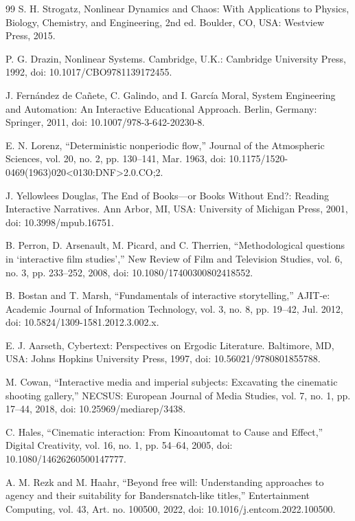 \begin{thebibliography}{99}
S. H. Strogatz, Nonlinear Dynamics and Chaos: With Applications to Physics, Biology, Chemistry, and Engineering, 2nd ed. Boulder, CO, USA: Westview Press, 2015.

P. G. Drazin, Nonlinear Systems. Cambridge, U.K.: Cambridge University Press, 1992, doi: 10.1017/CBO9781139172455.

J. Fernández de Cañete, C. Galindo, and I. García Moral, System Engineering and Automation: An Interactive Educational Approach. Berlin, Germany: Springer, 2011, doi: 10.1007/978-3-642-20230-8.

E. N. Lorenz, “Deterministic nonperiodic flow,” Journal of the Atmospheric Sciences, vol. 20, no. 2, pp. 130–141, Mar. 1963, doi: 10.1175/1520-0469(1963)020<0130:DNF>2.0.CO;2.

J. Yellowlees Douglas, The End of Books—or Books Without End?: Reading Interactive Narratives. Ann Arbor, MI, USA: University of Michigan Press, 2001, doi: 10.3998/mpub.16751.

B. Perron, D. Arsenault, M. Picard, and C. Therrien, “Methodological questions in ‘interactive film studies’,” New Review of Film and Television Studies, vol. 6, no. 3, pp. 233–252, 2008, doi: 10.1080/17400300802418552.

B. Bostan and T. Marsh, “Fundamentals of interactive storytelling,” AJIT-e: Academic Journal of Information Technology, vol. 3, no. 8, pp. 19–42, Jul. 2012, doi: 10.5824/1309-1581.2012.3.002.x.

E. J. Aarseth, Cybertext: Perspectives on Ergodic Literature. Baltimore, MD, USA: Johns Hopkins University Press, 1997, doi: 10.56021/9780801855788.

M. Cowan, “Interactive media and imperial subjects: Excavating the cinematic shooting gallery,” NECSUS: European Journal of Media Studies, vol. 7, no. 1, pp. 17–44, 2018, doi: 10.25969/mediarep/3438.

C. Hales, “Cinematic interaction: From Kinoautomat to Cause and Effect,” Digital Creativity, vol. 16, no. 1, pp. 54–64, 2005, doi: 10.1080/14626260500147777.

A. M. Rezk and M. Haahr, “Beyond free will: Understanding approaches to agency and their suitability for Bandersnatch-like titles,” Entertainment Computing, vol. 43, Art. no. 100500, 2022, doi: 10.1016/j.entcom.2022.100500.


\end{thebibliography}
